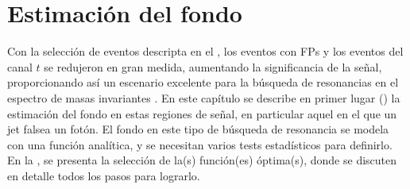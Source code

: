 \chapter{Estimación del fondo}
\label{ch:bkg}


Con la selección de eventos descripta en el \Ch{\ref{ch:evt_selection}}, los eventos con \acp{FP} y los eventos del canal \(t\) se redujeron en gran medida, aumentando la significancia de la señal, proporcionando así un escenario excelente para la búsqueda de resonancias en el espectro de masas invariantes \myj. En este capítulo se describe en primer lugar (\Sect{\ref{sec:bkg:estimation}}) la estimación del fondo en estas regiones de señal, en particular aquel en el que un jet falsea un fotón. El fondo en este tipo de búsqueda de resonancia se modela con una función analítica, y se necesitan varios tests estadísticos para definirlo. En la \Sect{\ref{sec:bkg:modeling}}, se presenta la selección de la(s) función(es) óptima(s), donde se discuten en detalle todos los pasos para lograrlo.





